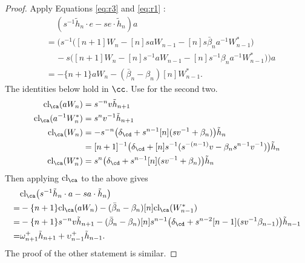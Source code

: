 \begin{proof}
Apply Equations \eqref{eq:r3} and \eqref{eq:r1} :
\begin{align*}
& \quad \, ( s^{-1} \tilde{h}_n \cdot e - s e \cdot \tilde{h}_n ) a \\
&=  \Big( s^{-1} \big( [n+1] W_n - [n] s a W_{n-1} - [n] s \bar{\beta}_n a^{-1} W^*_{n-1} \big) \\
&\quad \, - s \big( [n+1] W_n - [n] s^{-1} a W_{n-1} - [n] s^{-1} \beta_n a^{-1} W^*_{n-1} \big) \Big) a \\
&= - \{n+1\} a W_n - ( \bar{\beta}_n - \beta_n ) [n] W^*_{n-1}.
\end{align*}
The identities below hold in $\cc$. Use \cite[Lemma 21]{She16} \AP{***} for the second two.
\begin{align*}
\textrm{cl}_\ca ( a W_n ) &= s^{-n} v \tilde{h}_{n+1} \\
\textrm{cl}_\ca ( a^{-1} W^*_n ) &= s^n v^{-1} \tilde{h}_{n+1} \\
\textrm{cl}_\ca ( W_n ) &= -s^{-n} \big( \delta_\cd + s^{n-1} [n] ( s v^{-1} + \beta_n ) \big) \tilde{h}_n \\
&= [n+1]^{-1} \big( \delta_\cd + [n]s^{-1} ( s^{-(n-1)} v - \beta_n s^{n-1} v^{-1} ) \big) \tilde{h}_n \\
\textrm{cl}_\ca ( W^*_n ) &= s^n \big( \delta_\cd + s^{n-1} [n] ( s v^{-1} + \beta_n ) \big) \tilde{h}_n
\end{align*}
Then applying $\textrm{cl}_\ca$ to the above gives
\begin{align*} 
& \textrm{cl}_\ca \big( s^{-1} \tilde{h}_n \cdot a - s a \cdot \tilde{h}_n \big) \\
=& - \{n+1\} \textrm{cl}_\ca ( a W_n ) - ( \bar{\beta}_n - \beta_n ) [n] \textrm{cl}_\ca ( W^*_{n-1} ) \\
= & - \{n+1\} s^{-n} v \tilde{h}_{n+1} - ( \bar{\beta}_n - \beta_n ) [n] s^{n-1} \big( \delta_\cd + s^{n-2} [n-1] ( s v^{-1} \beta_{n-1} ) \big) \tilde{h}_{n-1} \\
= & \omega_{n+1}^+ \tilde{h}_{n+1} + \upsilon_{n-1}^+ \tilde{h}_{n-1}.
\end{align*}
The proof of the other statement is similar. 
\end{proof}

